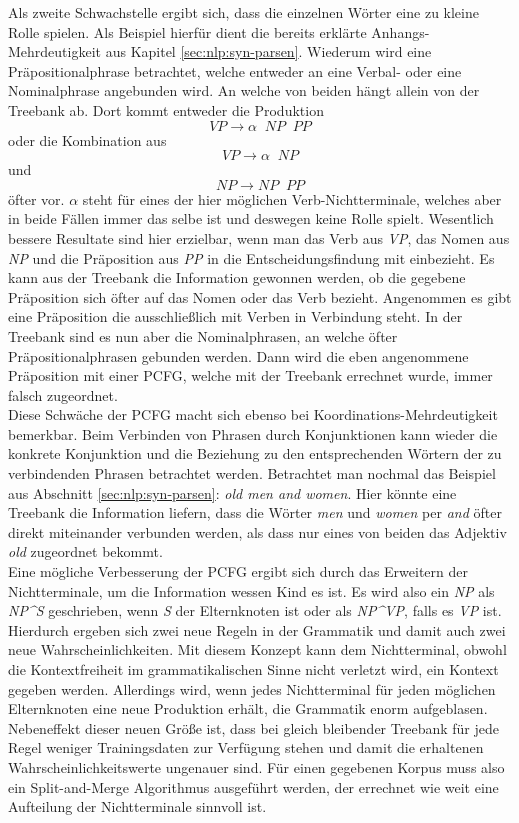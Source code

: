 Als zweite Schwachstelle ergibt sich, dass die einzelnen Wörter eine zu kleine Rolle spielen. Als Beispiel hierfür dient die bereits erklärte Anhangs-Mehrdeutigkeit aus Kapitel \ref{sec:nlp:syn-parsen}. Wiederum wird eine Präpositionalphrase betrachtet, welche entweder an eine Verbal- oder eine Nominalphrase angebunden wird. An welche von beiden hängt allein von der Treebank ab. Dort kommt entweder die Produktion \[ VP  \to  \alpha \;\;  NP \;\; PP \] oder die Kombination aus \[ VP  \to  \alpha \;\; NP \] und \[ NP  \to  NP \;\; PP \] öfter vor. \( \alpha \) steht für eines der hier möglichen Verb-Nichtterminale, welches aber in beide Fällen immer das selbe ist und deswegen keine Rolle spielt. Wesentlich bessere Resultate sind hier erzielbar, wenn man das Verb aus \textit{VP}, das Nomen aus \textit{NP} und die Präposition aus \textit{PP} in die Entscheidungsfindung mit einbezieht. Es kann aus der Treebank die Information gewonnen werden, ob die gegebene Präposition sich öfter auf das Nomen oder das Verb bezieht. Angenommen es gibt eine Präposition die ausschließlich mit Verben in Verbindung steht. In der Treebank sind es nun aber die Nominalphrasen, an welche öfter Präpositionalphrasen gebunden werden. Dann wird die eben angenommene Präposition mit einer PCFG, welche mit der Treebank errechnet wurde, immer falsch zugeordnet. \\ Diese Schwäche der PCFG macht sich ebenso bei Koordinations-Mehrdeutigkeit bemerkbar. Beim Verbinden von Phrasen durch Konjunktionen kann wieder die konkrete Konjunktion und die Beziehung zu den entsprechenden Wörtern der zu verbindenden Phrasen betrachtet werden. Betrachtet man nochmal das Beispiel aus Abschnitt \ref{sec:nlp:syn-parsen}: \textit{old men and women}. Hier könnte eine Treebank die Information liefern, dass die Wörter \textit{men} und \textit{women} per \textit{and} öfter direkt miteinander verbunden werden, als dass nur eines von beiden das Adjektiv \textit{old} zugeordnet bekommt. \\
Eine mögliche Verbesserung der PCFG ergibt sich durch das Erweitern der Nichtterminale, um die Information wessen Kind es ist. Es wird also ein \textit{NP} als \textit{NP\^{}S} geschrieben, wenn \textit{S} der Elternknoten ist oder als \textit{NP\^{}VP}, falls es \textit{VP} ist. Hierdurch ergeben sich zwei neue Regeln in der Grammatik und damit auch zwei neue Wahrscheinlichkeiten. Mit diesem Konzept kann dem Nichtterminal, obwohl die Kontextfreiheit im grammatikalischen Sinne nicht verletzt wird, ein Kontext gegeben werden. Allerdings wird, wenn jedes Nichtterminal für jeden möglichen Elternknoten eine neue Produktion erhält, die Grammatik enorm aufgeblasen. Nebeneffekt dieser neuen Größe ist, dass bei gleich bleibender Treebank für jede Regel weniger Trainingsdaten zur Verfügung stehen und damit die erhaltenen Wahrscheinlichkeitswerte ungenauer sind. Für einen gegebenen Korpus muss also ein Split-and-Merge Algorithmus ausgeführt werden, der errechnet wie weit eine Aufteilung der Nichtterminale sinnvoll ist.  

